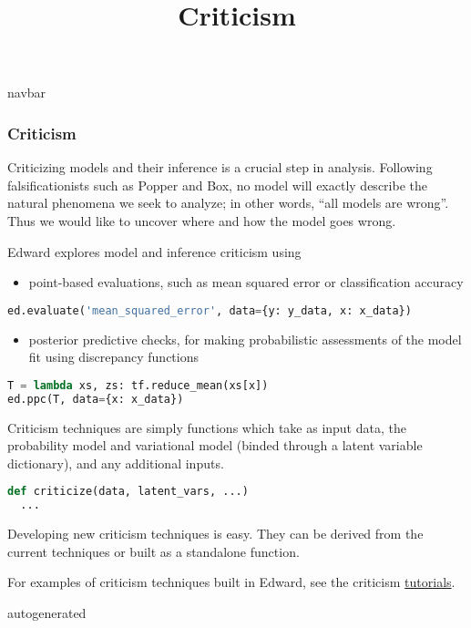 \title{Criticism}

{{navbar}}

\subsubsection{Criticism}

Criticizing models and their inference is a crucial step in analysis.
Following falsificationists such as Popper and Box, no model will exactly
describe the natural phenomena we seek to analyze; in other words, ``all models
are wrong''. Thus we would like to uncover where and how the model goes wrong.

Edward explores model and inference criticism using
\begin{itemize}
  \item point-based evaluations, such as mean squared error or
  classification accuracy
\end{itemize}
\begin{lstlisting}[language=Python]
ed.evaluate('mean_squared_error', data={y: y_data, x: x_data})
\end{lstlisting}
\begin{itemize}
  \item posterior predictive checks, for making probabilistic
  assessments of the model fit using discrepancy functions
\end{itemize}
\begin{lstlisting}[language=Python]
T = lambda xs, zs: tf.reduce_mean(xs[x])
ed.ppc(T, data={x: x_data})
\end{lstlisting}

Criticism techniques are simply functions which take as input data,
the probability model and variational model (binded through a latent
variable dictionary), and any additional inputs.

\begin{lstlisting}[language=Python]
def criticize(data, latent_vars, ...)
  ...
\end{lstlisting}

Developing new criticism techniques is easy.  They can be derived from
the current techniques or built as a standalone function.

For examples of criticism techniques built in Edward, see the
criticism
\href{/tutorials/}{tutorials}.

{{autogenerated}}
